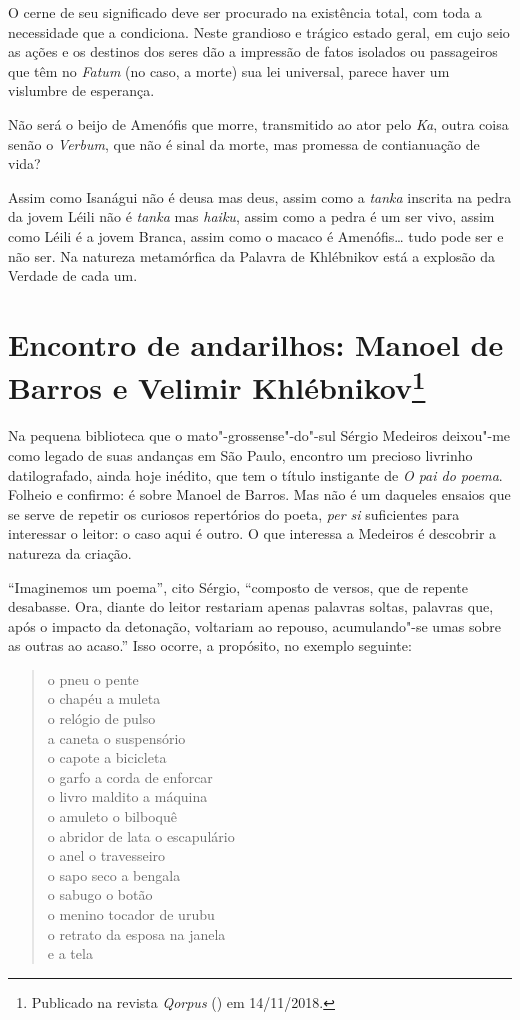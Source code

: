 O cerne de seu significado deve ser procurado na existência total,
com toda a necessidade que a condiciona. Neste grandioso e trágico
estado geral, em cujo seio as ações e os destinos dos seres dão a
impressão de fatos isolados ou passageiros que têm no \emph{Fatum}
(no caso, a morte) sua lei universal, parece haver um vislumbre de
esperança.

Não será o beijo de Amenófis que morre, transmitido ao ator pelo
\emph{Ka}, outra coisa senão o \emph{Verbum}, que não é sinal da morte,
mas promessa de contianuação de vida?

Assim como Isanágui não é deusa mas deus, assim como a \emph{tanka}
inscrita na pedra da jovem Léili não é \emph{tanka} mas \emph{haiku},
assim como a pedra é um ser vivo, assim como Léili é a jovem Branca,
assim como o macaco é Amenófis\ldots{} tudo pode ser e não ser. Na natureza
metamórfica da Palavra de Khlébnikov está a explosão da Verdade de cada
um.

\chapter{Encontro de andarilhos: Manoel de Barros e Velimir Khlébnikov\footnote{Publicado na revista
  \emph{Qorpus} ({}) em 14/11/2018.}}

Na pequena biblioteca que o mato"-grossense"-do"-sul Sérgio Medeiros
deixou"-me como legado de suas andanças em São Paulo, encontro um
precioso livrinho datilografado, ainda hoje inédito, que tem o título
instigante de \emph{O pai do poema}. Folheio e confirmo: é sobre Manoel
de Barros. Mas não é um daqueles ensaios que se serve de repetir os
curiosos repertórios do poeta, \emph{per si} suficientes para interessar
o leitor: o caso aqui é outro. O que interessa a Medeiros é descobrir a
natureza da criação.

``Imaginemos um poema'', cito Sérgio, ``composto de versos, que de
repente desabasse. Ora, diante do leitor restariam apenas palavras
soltas, palavras que, após o impacto da detonação, voltariam ao repouso,
acumulando"-se umas sobre as outras ao acaso.'' Isso ocorre, a propósito,
no exemplo seguinte:

\begin{verse}
o pneu o pente \\
o chapéu a muleta \\
o relógio de pulso \\
a caneta o suspensório \\
o capote a bicicleta \\
o garfo a corda de enforcar \\
o livro maldito a máquina \\
o amuleto o bilboquê \\
o abridor de lata o escapulário \\
o anel o travesseiro \\
o sapo seco a bengala \\
o sabugo o botão \\
o menino tocador de urubu \\
o retrato da esposa na janela \\
e a tela
\end{verse}

